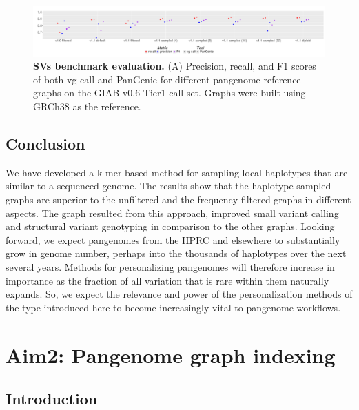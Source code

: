 \documentclass[11pt]{ucthesis}
\begin{document}
\begin{figure}[h]
    \centering
    \includegraphics[width=\linewidth]{Images/figure4.pdf}
    \caption[SVs benchmark evaluation]{\textbf{SVs benchmark evaluation.} (A) Precision, recall, and F1 scores of both vg call and PanGenie
for different pangenome reference graphs on the GIAB v0.6 Tier1 call set. Graphs were built using GRCh38
as the reference.}
    \label{fig:1:5}
\end{figure}

\section{Conclusion}
We have developed a k-mer-based method for sampling local haplotypes that are similar to a sequenced genome. The results show that the haplotype sampled graphs are superior to the unfiltered and the frequency filtered graphs in different aspects. The graph resulted from this approach,  improved small variant calling and structural variant genotyping in comparison to the other graphs. Looking forward, we expect pangenomes from the HPRC and elsewhere to substantially grow in genome number, perhaps into the thousands of haplotypes over the next several years. Methods for personalizing pangenomes will therefore increase in importance as the fraction of all variation that is rare within them naturally expands. So, we expect the relevance and power of the personalization methods of the type introduced here to become increasingly vital to pangenome workflows.














\chapter{Aim2: Pangenome graph indexing}

\section{Introduction}
\end{document}

